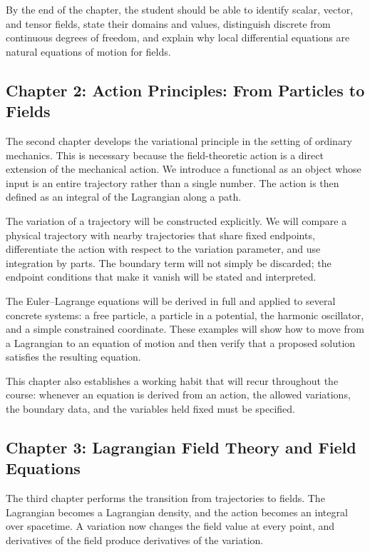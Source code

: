 By the end of the chapter, the student should be able to identify scalar, vector, and tensor fields, state their domains and values, distinguish discrete from continuous degrees of freedom, and explain why local differential equations are natural equations of motion for fields.

\subsection*{Chapter 2: Action Principles: From Particles to Fields}

The second chapter develops the variational principle in the setting of ordinary mechanics. This is necessary because the field-theoretic action is a direct extension of the mechanical action. We introduce a functional as an object whose input is an entire trajectory rather than a single number. The action is then defined as an integral of the Lagrangian along a path.

The variation of a trajectory will be constructed explicitly. We will compare a physical trajectory with nearby trajectories that share fixed endpoints, differentiate the action with respect to the variation parameter, and use integration by parts. The boundary term will not simply be discarded; the endpoint conditions that make it vanish will be stated and interpreted.

The Euler--Lagrange equations will be derived in full and applied to several concrete systems: a free particle, a particle in a potential, the harmonic oscillator, and a simple constrained coordinate. These examples will show how to move from a Lagrangian to an equation of motion and then verify that a proposed solution satisfies the resulting equation.

This chapter also establishes a working habit that will recur throughout the course: whenever an equation is derived from an action, the allowed variations, the boundary data, and the variables held fixed must be specified.

\subsection*{Chapter 3: Lagrangian Field Theory and Field Equations}

The third chapter performs the transition from trajectories to fields. The Lagrangian becomes a Lagrangian density, and the action becomes an integral over spacetime. A variation now changes the field value at every point, and derivatives of the field produce derivatives of the variation.

